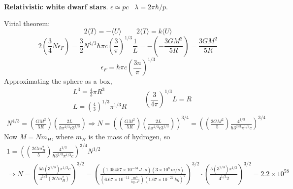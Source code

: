  \textbf{Relativistic white dwarf stars}.  
$\epsilon \simeq pc$  \quad \, $\lambda = 2\pi \hbar /p$.  

Virial theorem:
\[
2 \langle T \rangle = - \langle U \rangle \quad \quad \, 2 \langle T \rangle = k \langle U \rangle
\]
\[
2 \left( \frac{3}{4} N \epsilon_F \right) = \frac{3}{2} N^{4/3} \hbar \pi c \left( \frac{3}{\pi } \right)^{1/3} \frac{1}{L} = - \left( - \frac{ 3 GM^2}{ 5 R } \right) = \frac{ 3 GM^2 }{ 5 R }
\]
\[
\epsilon_F = \hbar \pi c \left( \frac{ 3 n}{ \pi } \right)^{1/3}
\]
Approximating the sphere as a box,
\[
\begin{aligned}
  & L^3 = \frac{4}{3} \pi R^3 \\ 
  & L = \left( \frac{ 4}{3} \right)^{1/3} \pi^{1/3} R
\end{aligned} \quad \quad \, \left( \frac{ 3}{ 4 \pi } \right)^{1/3} L = R
\]
\[
\begin{gathered}
N^{4/3} = \left( \frac{ GM^2}{ 5 R} \right)\left( \frac{ 2L}{ \hbar \pi^{2/3} c 3^{1/3}} \right) \Longrightarrow N = \left( \left( \frac{ GM^2}{ 5R} \right)\left( \frac{ 2 L }{ \hbar \pi^{2/3} c 3^{1/3}} \right) \right)^{3/4} = \left( \left( \frac {2 GM^2}{ 5 } \right) \frac{ 4^{1/3} }{ \hbar 3^{2/3} \pi^{1/3} c } \right)^{3/4}
\end{gathered}
\]
Now $M = Nm_H$, where $m_H$ is the mass of hydrogen, so
\[
\begin{gathered}
  1 = \left( \left( \frac{ 2 G m_H^2}{ 5} \right) \frac{ 4^{1/3} }{ \hbar 3^{2/3} \pi^{1/3} c } \right)^{3/4} N^{1/2} \\ 
  \Longrightarrow N = \left( \frac{ 5 \hbar (3^{2/3}) \pi^{1/3} c }{ 4^{1/3} (2Gm_H^2) } \right)^{3/2} = \left( \frac{ (1.05457 \times 10^{-34} \, J\cdot s )( 3\times 10^8 \, m/s) }{ (6.67 \times 10^{-11} \, \frac{m^3}{ kg\cdot s^2} ) ( 1.67 \times 10^{-27} \, kg)^2 } \right)^{3/2} \cdot \left( \frac{ 5 (3^{2/3}) \pi^{1/3} }{ 4^{1/3} 2 } \right)^{3/2} = 2.2 \times 10^{58}
\end{gathered}
\]



